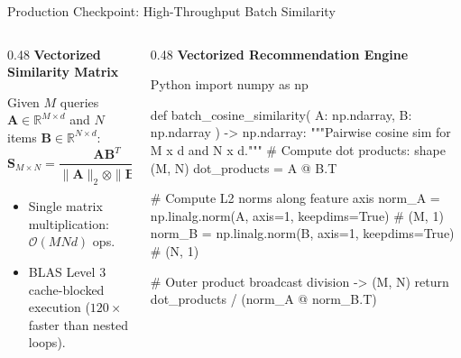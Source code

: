 \documentclass[../m00-session-02.tex]{subfiles}
\begin{document}
\begin{frame}[fragile]{Production Checkpoint: High-Throughput Batch Similarity}
  \begin{columns}[T,onlytextwidth]
    \begin{column}{0.48\textwidth}
      {\small\bfseries\color{UpGradNight}Vectorized Similarity Matrix}\par\vspace{0.08cm}
      Given $M$ queries $\mathbf{A} \in \mathbb{R}^{M \times d}$ and $N$ items $\mathbf{B} \in \mathbb{R}^{N \times d}$:
      \[
      \mathbf{S}_{M \times N} = \frac{\mathbf{A} \mathbf{B}^T}{\|\mathbf{A}\|_2 \otimes \|\mathbf{B}\|_2^T}
      \]
      \begin{itemize}\setlength{\itemsep}{0.20em}\small
        \item Single matrix multiplication: $\mathcal{O}(M N d)$ ops.
        \item BLAS Level 3 cache-blocked execution ($120\times$ faster than nested loops).
      \end{itemize}
      \vspace{0.08cm}
    \end{column}
    \hfill
    \begin{column}{0.48\textwidth}
      {\small\bfseries\color{UpGradRed}Vectorized Recommendation Engine}\par\vspace{0.06cm}
\begin{CodeBlock}{Python}
import numpy as np

def batch_cosine_similarity(
    A: np.ndarray, B: np.ndarray
) -> np.ndarray:
    """Pairwise cosine sim for M x d and N x d."""
    # Compute dot products: shape (M, N)
    dot_products = A @ B.T
    
    # Compute L2 norms along feature axis
    norm_A = np.linalg.norm(A, axis=1, keepdims=True) # (M, 1)
    norm_B = np.linalg.norm(B, axis=1, keepdims=True) # (N, 1)
    
    # Outer product broadcast division -> (M, N)
    return dot_products / (norm_A @ norm_B.T)
\end{CodeBlock}
    \end{column}
  \end{columns}
\end{frame}
\end{document}
